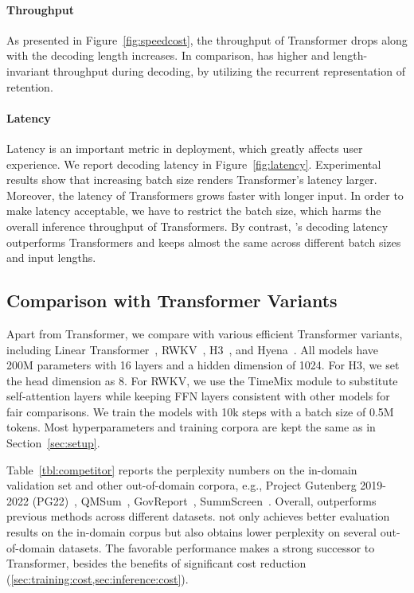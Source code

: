 \paragraph{Throughput}
As presented in Figure~\ref{fig:speedcost}, the throughput of Transformer drops along with the decoding length increases. In comparison, \our{} has higher and length-invariant throughput during decoding, by utilizing the recurrent representation of retention.

\paragraph{Latency}
Latency is an important metric in deployment, which greatly affects user experience. We report decoding latency in Figure~\ref{fig:latency}.
Experimental results show that increasing batch size renders Transformer's latency larger. Moreover, the latency of Transformers grows faster with longer input. In order to make latency acceptable, we have to restrict the batch size, which harms the overall inference throughput of Transformers. By contrast, \our{}'s decoding latency outperforms Transformers and keeps almost the same across different batch sizes and input lengths.

\subsection{Comparison with Transformer Variants}
\label{sec:competitor}

Apart from Transformer, we compare \our{} with various efficient Transformer variants, including Linear Transformer~\cite{linear-transformer}, RWKV~\cite{rwkv}, H3~\cite{h3}, and Hyena~\cite{hyena}. All models have 200M parameters with 16 layers and a hidden dimension of 1024. For H3, we set the head dimension as 8. For RWKV, we use the TimeMix module to substitute self-attention layers while keeping FFN layers consistent with other models for fair comparisons. We train the models with 10k steps with a batch size of 0.5M tokens. Most hyperparameters and training corpora are kept the same as in Section~\ref{sec:setup}.

Table~\ref{tbl:competitor} reports the perplexity numbers on the in-domain validation set and other out-of-domain corpora, e.g., Project Gutenberg 2019-2022 (PG22)~\cite{lex}, QMSum~\cite{qmsum}, GovReport~\cite{govreport}, SummScreen~\cite{summscreen,scrolls}. Overall, \our{} outperforms previous methods across different datasets.
\our{} not only achieves better evaluation results on the in-domain corpus but also obtains lower perplexity on several out-of-domain datasets. The favorable performance makes \our{} a strong successor to Transformer, besides the benefits of significant cost reduction (\ref{sec:training:cost,sec:inference:cost}).

